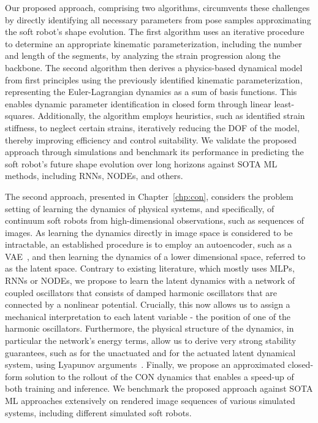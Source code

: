 Our proposed approach, comprising two algorithms, circumvents these challenges by directly identifying all necessary parameters from pose samples approximating the soft robot’s shape evolution.
The first algorithm uses an iterative procedure to determine an appropriate kinematic parameterization, including the number and length of the segments, by analyzing the strain progression along the backbone.
The second algorithm then derives a physics-based dynamical model from first principles using the previously identified kinematic parameterization, representing the Euler-Lagrangian dynamics as a sum of basis functions. This enables dynamic parameter identification in closed form through linear least-squares.
Additionally, the algorithm employs heuristics, such as identified strain stiffness, to neglect certain strains, iteratively reducing the \gls{DOF} of the model, thereby improving efficiency and control suitability.
We validate the proposed approach through simulations and benchmark its performance in predicting the soft robot’s future shape evolution over long horizons against \gls{SOTA} \gls{ML} methods, including \glspl{RNN}, \glspl{NODE}, and others.

The second approach, presented in Chapter~\ref{chp:con}, considers the problem setting of learning the dynamics of physical systems, and specifically, of continuum soft robots from high-dimensional observations, such as sequences of images.
As learning the dynamics directly in image space is considered to be intractable, an established procedure is to employ an autoencoder, such as a \gls{VAE}~\citep{kingma2014auto}, and then learning the dynamics of a lower dimensional space, referred to as the latent space.
Contrary to existing literature, which mostly uses \glspl{MLP}, \glspl{RNN} or \glspl{NODE}, we propose to learn the latent dynamics with a network of coupled oscillators that consists of damped harmonic oscillators that are connected by a nonlinear potential.
Crucially, this now allows us to assign a mechanical interpretation to each latent variable - the position of one of the harmonic oscillators.
Furthermore, the physical structure of the  dynamics, in particular the network's energy terms, allow us to derive very strong stability guarantees, such as  for the unactuated and  for the actuated latent dynamical system, using Lyapunov arguments~\citep{khalil2002nonlinear}.
Finally, we propose an approximated closed-form solution to the rollout of the \gls{CON} dynamics that enables a speed-up of both training and inference.
We benchmark the proposed approach against \gls{SOTA} \gls{ML} approaches extensively on rendered image sequences of various simulated systems, including different simulated soft robots.



